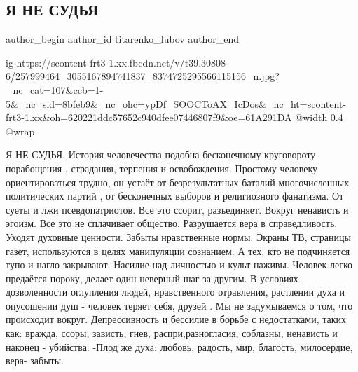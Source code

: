  
 
 
 
 
 
\subsection{Я НЕ СУДЬЯ}
\label{sec:19_11_2021.fb.titarenko_lubov.1.ja_ne_sudja}
 
\ifcmt
 author_begin
   author_id titarenko_lubov
 author_end
\fi

\ifcmt
  ig https://scontent-frt3-1.xx.fbcdn.net/v/t39.30808-6/257999464_3055167894741837_8374725295566115156_n.jpg?_nc_cat=107&ccb=1-5&_nc_sid=8bfeb9&_nc_ohc=ypDf_SOOCToAX_IcDos&_nc_ht=scontent-frt3-1.xx&oh=620221ddc57652c940dfee07446807f9&oe=61A291DA
  @width 0.4
  @wrap 
\fi

\obeycr
Я НЕ СУДЬЯ.
История человечества подобна  бесконечному круговороту  порабощения , страдания, терпения и освобождения. 
Простому человеку ориентироваться трудно,
  он устаёт от безрезультатных баталий  многочисленных 
политических партий , от бесконечных выборов  и 
религиозного фанатизма.  
От суеты и лжи псевдопатриотов. Все это  ссорит, разъединяет. 
Вокруг ненависть и эгоизм. Все это не сплачивает общество. 
Разрушается вера в справедливость. Уходят духовные ценности.
Забыты нравственные нормы.
Экраны ТВ, страницы газет, используются в целях манипуляции сознанием. А тех, кто не подчиняется тупо и нагло закрывают.
Насилие  над личностью и культ наживы.
Человек легко предаётся пороку, делает один неверный шаг за другим.
В условиях  дозволенности оглупления людей, нравственного отравления, растлении духа и опусошении душ - человек теряет себя, друзей . Мы не задумываемся  о том, что происходит вокруг. 
Депрессивность и бессилие в борьбе с недостатками, таких как:
 вражда, ссоры, зависть, гнев, распри,разногласия, соблазны, ненависть и наконец - убийства.
-Плод же духа: 
любовь, радость, мир, благость, 
милосердие, вера- забыты. 
\restorecr

